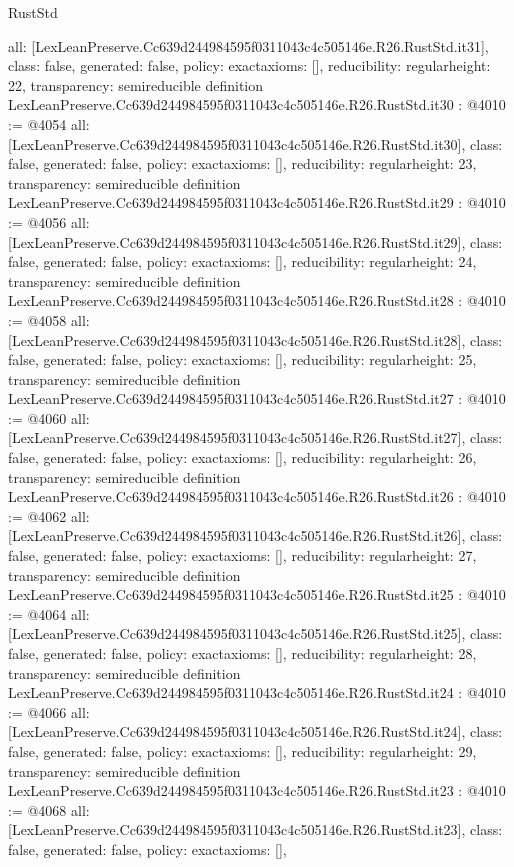 \begin{lexlean}{RustStd}
\begin{coremodule}
{  all: [LexLeanPreserve.Cc639d244984595f0311043c4c505146e.R26.RustStd.it31],
  class: false,
  generated: false,
  policy: exact{axioms: []},
  reducibility: regular{height: 22},
  transparency: semireducible
}
definition LexLeanPreserve.Cc639d244984595f0311043c4c505146e.R26.RustStd.it30 : @4010 := @4054 {
  all: [LexLeanPreserve.Cc639d244984595f0311043c4c505146e.R26.RustStd.it30],
  class: false,
  generated: false,
  policy: exact{axioms: []},
  reducibility: regular{height: 23},
  transparency: semireducible
}
definition LexLeanPreserve.Cc639d244984595f0311043c4c505146e.R26.RustStd.it29 : @4010 := @4056 {
  all: [LexLeanPreserve.Cc639d244984595f0311043c4c505146e.R26.RustStd.it29],
  class: false,
  generated: false,
  policy: exact{axioms: []},
  reducibility: regular{height: 24},
  transparency: semireducible
}
definition LexLeanPreserve.Cc639d244984595f0311043c4c505146e.R26.RustStd.it28 : @4010 := @4058 {
  all: [LexLeanPreserve.Cc639d244984595f0311043c4c505146e.R26.RustStd.it28],
  class: false,
  generated: false,
  policy: exact{axioms: []},
  reducibility: regular{height: 25},
  transparency: semireducible
}
definition LexLeanPreserve.Cc639d244984595f0311043c4c505146e.R26.RustStd.it27 : @4010 := @4060 {
  all: [LexLeanPreserve.Cc639d244984595f0311043c4c505146e.R26.RustStd.it27],
  class: false,
  generated: false,
  policy: exact{axioms: []},
  reducibility: regular{height: 26},
  transparency: semireducible
}
definition LexLeanPreserve.Cc639d244984595f0311043c4c505146e.R26.RustStd.it26 : @4010 := @4062 {
  all: [LexLeanPreserve.Cc639d244984595f0311043c4c505146e.R26.RustStd.it26],
  class: false,
  generated: false,
  policy: exact{axioms: []},
  reducibility: regular{height: 27},
  transparency: semireducible
}
definition LexLeanPreserve.Cc639d244984595f0311043c4c505146e.R26.RustStd.it25 : @4010 := @4064 {
  all: [LexLeanPreserve.Cc639d244984595f0311043c4c505146e.R26.RustStd.it25],
  class: false,
  generated: false,
  policy: exact{axioms: []},
  reducibility: regular{height: 28},
  transparency: semireducible
}
definition LexLeanPreserve.Cc639d244984595f0311043c4c505146e.R26.RustStd.it24 : @4010 := @4066 {
  all: [LexLeanPreserve.Cc639d244984595f0311043c4c505146e.R26.RustStd.it24],
  class: false,
  generated: false,
  policy: exact{axioms: []},
  reducibility: regular{height: 29},
  transparency: semireducible
}
definition LexLeanPreserve.Cc639d244984595f0311043c4c505146e.R26.RustStd.it23 : @4010 := @4068 {
  all: [LexLeanPreserve.Cc639d244984595f0311043c4c505146e.R26.RustStd.it23],
  class: false,
  generated: false,
  policy: exact{axioms: []},
}
\end{coremodule}
\end{lexlean}
